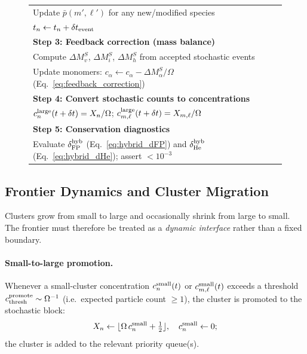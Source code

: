 \documentclass[pdflatex,sn-basic]{sn-jnl} %
\begin{document}
\begin{figure}[htbp]
\begin{tabular}{l}
\qquad Update $\bar{p}(m',\ell')$ for any new/modified species \\
\qquad $t_n \leftarrow t_n + \delta t_{\rm event}$ \\[3pt]
%
\textbf{Step 3: Feedback correction (mass balance)} \\
\quad Compute $\Delta M_v^S$, $\Delta M_i^S$, $\Delta M_h^S$
  from accepted stochastic events \\
\quad Update monomers:
  $c_\alpha \leftarrow c_\alpha - \Delta M_\alpha^S / \Omega$
  (Eq.~\ref{eq:feedback_correction}) \\[3pt]
%
\textbf{Step 4: Convert stochastic counts to concentrations} \\
\quad $c_n^{\rm large}(t+\delta t) = X_n/\Omega$;\quad
  $c_{m,\ell}^{\rm large}(t+\delta t) = X_{m,\ell}/\Omega$ \\[3pt]
%
\textbf{Step 5: Conservation diagnostics} \\
\quad Evaluate $\delta_{\rm FP}^{\rm hyb}$
  (Eq.~\ref{eq:hybrid_dFP}) and $\delta_{\rm He}^{\rm hyb}$
  (Eq.~\ref{eq:hybrid_dHe}); assert $< 10^{-3}$ \\
\hline\hline
\end{tabular}
\label{alg:hybrid}
\end{figure}

\subsection{Frontier Dynamics and Cluster Migration}
\label{sec:hybrid_frontier}

Clusters grow from small to large and occasionally shrink from large
to small.  The frontier must therefore be treated as a \emph{dynamic
interface} rather than a fixed boundary.

\paragraph{Small-to-large promotion.}
Whenever a small-cluster concentration $c_n^{\rm small}(t)$ or
$c_{m,\ell}^{\rm small}(t)$ exceeds a threshold
$c_{\rm thresh}^{\rm promote} \sim \Omega^{-1}$ (i.e.\ expected
particle count $\geq 1$), the cluster is promoted to the stochastic
block:
\begin{equation}\label{eq:promote}
    X_n \leftarrow \lfloor \Omega\,c_n^{\rm small} + \tfrac{1}{2} \rfloor,
    \quad
    c_n^{\rm small} \leftarrow 0;
\end{equation}
the cluster is added to the relevant priority queue(s).
\end{document}
